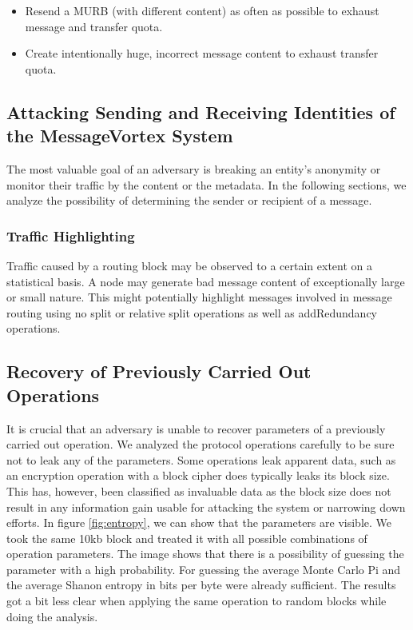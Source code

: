 \begin{itemize}
	\item Resend a MURB (with different content) as often as possible to exhaust message and transfer quota. 
	\item Create intentionally huge, incorrect message content to exhaust transfer quota.
\end{itemize}

\subsection{Attacking Sending and Receiving Identities of the MessageVortex System}
The most valuable goal of an adversary is breaking an entity's anonymity or monitor their traffic by the content or the metadata. In the following sections, we analyze the possibility of determining the sender or recipient of a message.


\subsubsection{Traffic Highlighting}
Traffic caused by a routing block may be observed to a certain extent on a statistical basis. A node may generate bad message content of exceptionally large or small nature. This might potentially highlight messages involved in message routing using no split or relative split operations as well as addRedundancy operations.

\subsection{Recovery of Previously Carried Out Operations}
It is crucial that an adversary is unable to recover parameters of a previously carried out operation. We analyzed the protocol operations carefully to be sure not to leak any of the parameters. Some operations leak apparent data, such as an encryption operation with a block cipher does typically leaks its block size. This has, however, been classified as invaluable data as the block size does not result in any information gain usable for attacking the system or narrowing down efforts. In figure \ref{fig:entropy}, we can show that the parameters are visible. We took the same 10kb block and treated it with all possible combinations of operation parameters. The image shows that there is a possibility of guessing the parameter with a high probability. For guessing the average Monte Carlo Pi and the average Shanon entropy in bits per byte were already sufficient. The results got a bit less clear when applying the same operation to random blocks while doing the analysis. 

